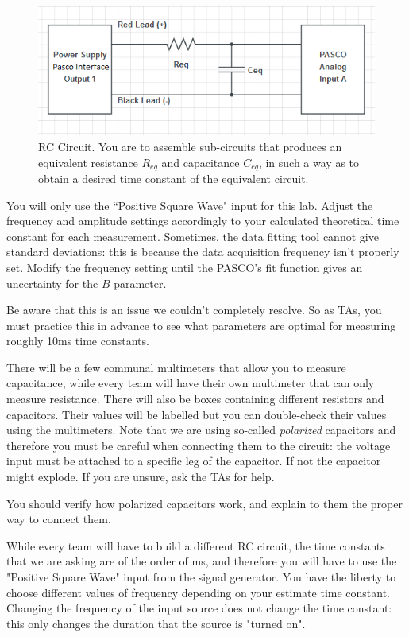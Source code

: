 \documentclass[12pt]{report}
\begin{document}
\begin{figure}[h]
\centering
\includegraphics[width=0.9\linewidth]{lab2-session2-circuit}
\caption{RC Circuit. You are to assemble sub-circuits that produces an equivalent resistance $R_{eq}$ and capacitance $C_{eq}$, in such a way as to obtain a desired time constant of the equivalent circuit.}
\label{Fig:lab2-session2-circuit}
\end{figure}

You will only use the ``Positive Square Wave" input for this lab. 
Adjust the frequency and amplitude settings accordingly to your calculated theoretical time constant for each measurement. 
Sometimes, the data fitting tool cannot give standard deviations: this is because the data acquisition frequency isn't properly set. 
Modify the frequency setting until the PASCO's fit function gives an uncertainty for the $B$ parameter. 
\begin{tcolorbox}
Be aware that this is an issue we couldn't completely resolve. So as TAs, you must practice this in advance to see what parameters are optimal for measuring roughly 10ms time constants.
\end{tcolorbox}

There will be a few communal multimeters that allow you to measure capacitance, while every team will have their own multimeter that can only measure resistance. 
There will also be boxes containing different resistors and capacitors. Their values will be labelled but you can double-check their values using the multimeters. 
Note that we are using so-called {\it polarized} capacitors and therefore you must be careful when connecting them to the circuit: the voltage input must be attached to a specific leg of the capacitor. If not the capacitor might explode. If you are unsure, ask the TAs for help. 
\begin{tcolorbox}
You should verify how polarized capacitors work, and explain to them the proper way to connect them.
\end{tcolorbox}

While every team will have to build a different RC circuit, the time constants that we are asking are of the order of ms, and therefore you will have to use the "Positive Square Wave" input from the signal generator. 
You have the liberty to choose different values of frequency depending on your estimate time constant. 
Changing the frequency of the input source does not change the time constant: this only changes the duration that the source is "turned on".
\end{document}
